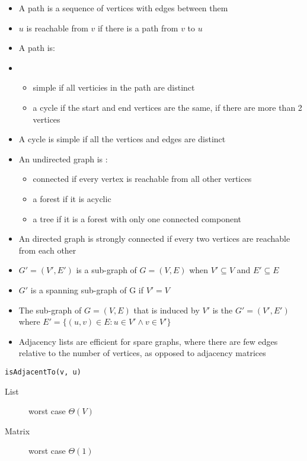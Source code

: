 \documentclass[landscape]{cheat}
\begin{document}
\begin{multicols*}{3}
\begin{itemize}
    \item A path is a sequence of vertices with edges between them
    \item $u$ is reachable from $v$ if there is a path from $v$ to $u$
    \item A path is:
    \item \begin{itemize}
        \item simple if all verticies in the path are distinct
        \item a cycle if the start and end vertices are the same, if there are more than 2 vertices
    \end{itemize}
    \item A cycle is simple if all the vertices and edges are distinct
    \item An undirected graph is :
        \begin{itemize}
            \item connected if every vertex is reachable from all other vertices
            \item a forest if it is acyclic
            \item a tree if it is a forest with only one connected component
        \end{itemize}
    \item An directed graph is strongly connected if every two vertices are reachable from each other
    \item $G' = (V', E')$ is a sub-graph of $G = (V, E)$ when $V' \subseteq V$ and $E' \subseteq E$
    \item $G'$ is a spanning sub-graph of G if $V' = V$
    \item The sub-graph of $G = (V, E)$ that is induced by $V'$ is the $G' = (V', E')$ where $E' = \{(u, v) \in E: u \in V' \wedge v \in V' \}$
    \item Adjacency lists are efficient for spare graphs, where there are few edges relative to the number of vertices, as opposed to adjacency matrices
\end{itemize}

\begin{lstlisting}
isAdjacentTo(v, u)
\end{lstlisting}
\begin{description}
    \item[List] worst case $\Theta(V)$
    \item[Matrix] worst case $\Theta(1)$
\end{description}


\end{multicols*}
\end{document}
